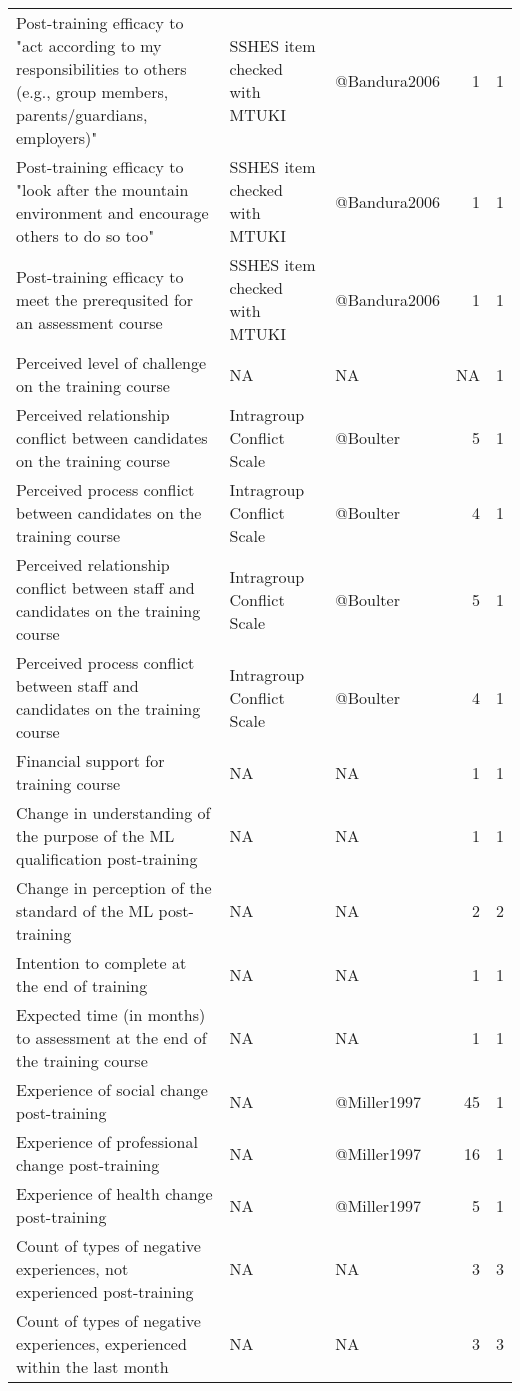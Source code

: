 \documentclass[a4paper,]{book}
\begin{document}
\begin{table}
\begin{tabular}[t]{lllrr}
Post-training efficacy to "act according to my responsibilities to others (e.g., group members, parents/guardians, employers)" & SSHES item checked with MTUKI & @Bandura2006 & 1 & 1\\
Post-training efficacy to "look after the mountain environment and encourage others to do so too" & SSHES item checked with MTUKI & @Bandura2006 & 1 & 1\\
\addlinespace
Post-training efficacy to meet the prerequsited for an assessment course & SSHES item checked with MTUKI & @Bandura2006 & 1 & 1\\
Perceived level of challenge on the training course & NA & NA & NA & 1\\
Perceived relationship conflict between candidates on the training course & Intragroup Conflict Scale & @Boulter & 5 & 1\\
Perceived process conflict between candidates on the training course & Intragroup Conflict Scale & @Boulter & 4 & 1\\
Perceived relationship conflict between staff and candidates on the training course & Intragroup Conflict Scale & @Boulter & 5 & 1\\
\addlinespace
Perceived process conflict between staff and candidates on the training course & Intragroup Conflict Scale & @Boulter & 4 & 1\\
Financial support for training course & NA & NA & 1 & 1\\
Change in understanding of the purpose of the ML qualification post-training & NA & NA & 1 & 1\\
Change in perception of the standard of the ML post-training & NA & NA & 2 & 2\\
Intention to complete at the end of training & NA & NA & 1 & 1\\
\addlinespace
Expected time (in months) to assessment at the end of the training course & NA & NA & 1 & 1\\
Experience of social change post-training & NA & @Miller1997 & 45 & 1\\
Experience of professional change post-training & NA & @Miller1997 & 16 & 1\\
Experience of health change post-training & NA & @Miller1997 & 5 & 1\\
Count of types of negative experiences, not experienced post-training & NA & NA & 3 & 3\\
\addlinespace
Count of types of negative experiences, experienced within the last month & NA & NA & 3 & 3\\

\end{tabular}
\end{table}
\end{document}
